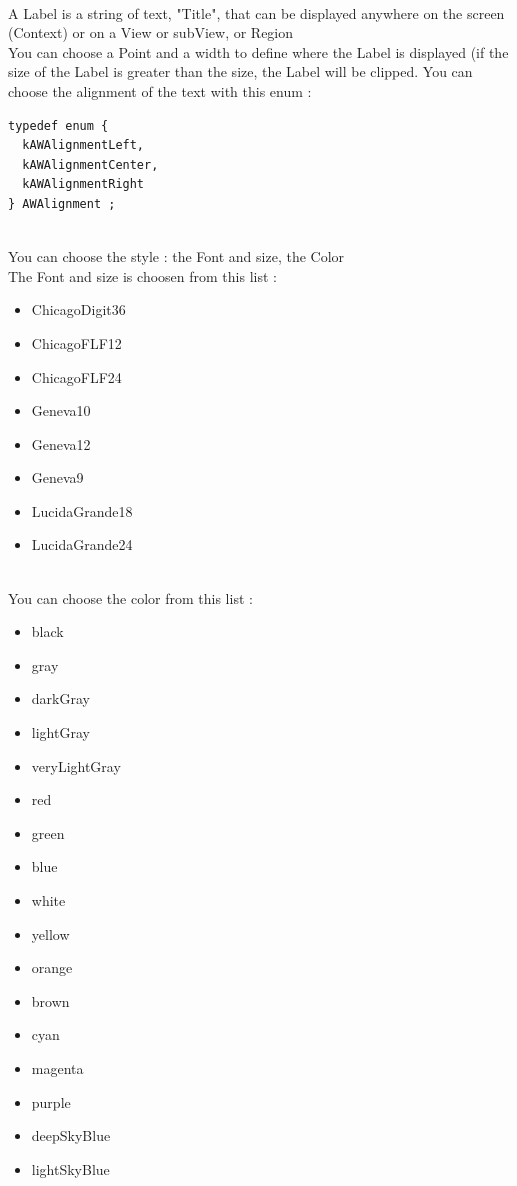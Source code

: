 \documentclass[a4paper,11pt]{extarticle}
\begin{document}
~\\ A Label is a string of text, "Title", that can be displayed anywhere on the screen (Context) or on a View or subView, or Region
~\\ You can choose a Point and a width to define where the Label is displayed (if the size of the Label is greater than the size, the Label will be clipped. You can choose the alignment of the text with this enum :

\begin{lstlisting}[language=Arduinonl]
typedef enum {
  kAWAlignmentLeft,
  kAWAlignmentCenter,
  kAWAlignmentRight
} AWAlignment ;
\end{lstlisting}

~\\ You can choose the style : the Font and size, the Color 
~\\ The Font and size is choosen from this list :
\begin{itemize}
\item ChicagoDigit36
\item ChicagoFLF12
\item ChicagoFLF24
\item Geneva10
\item Geneva12
\item Geneva9
\item LucidaGrande18
\item LucidaGrande24
\end{itemize}

~\\ You can choose the color from this list :

\begin{itemize}
\item black
\item gray
\item darkGray
\item lightGray
\item veryLightGray
\item red
\item green
\item blue
\item white
\item yellow
\item orange
\item brown
\item cyan
\item magenta
\item purple
\item deepSkyBlue
\item lightSkyBlue
\end{itemize}
\end{document}

